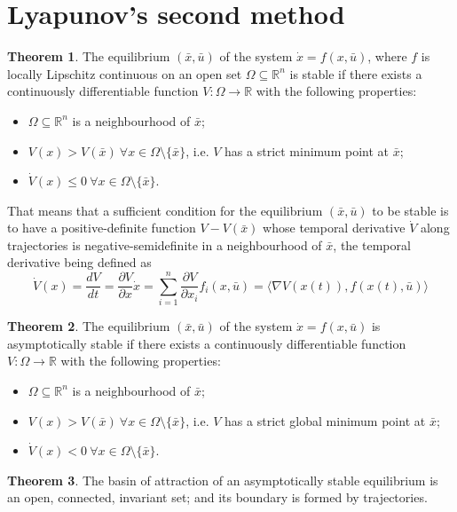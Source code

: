 \documentclass[12pt, openany]{report}
\theoremstyle{definition}
\newtheorem{thm}{Theorem}[chapter]
\newcommand{\R}{\mathbb{R}}
\begin{document}
\section{Lyapunov's second method}
\begin{thm}
    The equilibrium \((\bar x,\bar u)\) of the system \(\dot x=f(x,\bar u)\), where \(f\) is locally Lipschitz continuous on an open set \(\Omega \subseteq \R^n\) is stable if there exists a continuously differentiable function \(V:\Omega\rightarrow \R\) with the following properties:
    \begin{itemize}
        \item \(\Omega\subseteq \R^n\) is a neighbourhood of \(\bar x\);
        \item \(V(x)>V(\bar x) \: \forall x\in \Omega \setminus \{\bar x\}\), i.e. \(V\) has a strict minimum point at \(\bar x\);
        \item \(\dot V(x)\le 0\:\forall x\in \Omega \setminus\{\bar x\}\).
    \end{itemize}
\end{thm}
That means that a sufficient condition for the equilibrium \((\bar x,\bar u)\) to be stable is to have a positive-definite function \(V-V(\bar x)\) whose temporal derivative \(\dot V\) along trajectories is negative-semidefinite in a neighbourhood of \(\bar x\), the temporal derivative being defined as 
\begin{equation}
    \dot V(x) = \frac{dV}{dt} = \frac{\partial V}{\partial x} \dot x = \sum_{i=1}^n \frac{\partial V}{\partial x_i}f_i(x,\bar u) = \langle \nabla V(x(t)),f(x(t),\bar u)\rangle
\end{equation}
\begin{thm}
    The equilibrium \((\bar x,\bar u)\) of the system \(\dot x = f(x,\bar u)\) is asymptotically stable if there exists a continuously differentiable function \(V:\Omega\rightarrow\R\) with the following properties:
    \begin{itemize}
        \item \(\Omega \subseteq \R^n\) is a neighbourhood of \(\bar x\);
        \item \(V(x)>V(\bar x) \: \forall x\in \Omega \setminus\{\bar x\}\), i.e. \(V\) has a strict global minimum point at \(\bar x\);
        \item \(\dot V(x)<0\: \forall x\in \Omega\setminus \{\bar x\}\).
    \end{itemize}
\end{thm}
\begin{thm}
    The basin of attraction of an asymptotically stable equilibrium is an open, connected, invariant set; and its boundary is formed by trajectories.
\end{thm}
\end{document}
